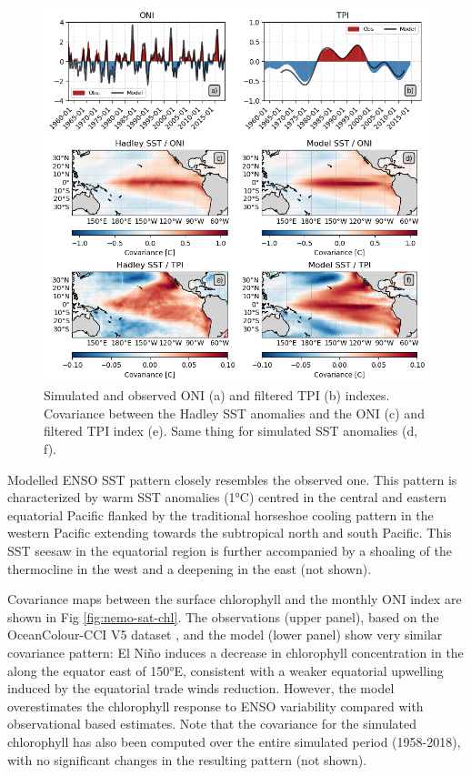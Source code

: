 \begin{figure}
	\centering
	\includegraphics[scale=0.4]{figs/fig1.png}
	\caption{Simulated and observed ONI (a) and filtered TPI (b) indexes. Covariance between the Hadley SST anomalies and the ONI (c) and filtered TPI index (e). Same thing for simulated SST anomalies (d, f).}
	\label{fig:nemo-had-sst}
\end{figure}

Modelled ENSO SST  pattern closely resembles the observed one. This pattern is characterized by warm SST anomalies (1°C) centred in the central and eastern equatorial Pacific  flanked by the traditional horseshoe cooling pattern in the western Pacific extending towards the subtropical north and south Pacific. This SST seesaw in the equatorial region is further accompanied by a shoaling of the thermocline in the west and a deepening in the east (not shown).

Covariance maps between the surface chlorophyll and the monthly ONI index are shown in Fig \ref{fig:nemo-sat-chl}. The observations (upper panel), based on the OceanColour-CCI V5 dataset \citep{sathyendranathOceanColourTimeSeries2019},  and the model (lower panel) show very similar covariance pattern: El Niño induces a decrease in chlorophyll concentration in the along the equator east of 150°E, consistent with a weaker equatorial upwelling induced by the equatorial trade winds reduction. However, the model overestimates the chlorophyll response to ENSO variability compared with observational based estimates. Note that the covariance for the simulated chlorophyll has also been computed over the entire simulated period (1958-2018), with no significant changes in the resulting pattern (not shown).

